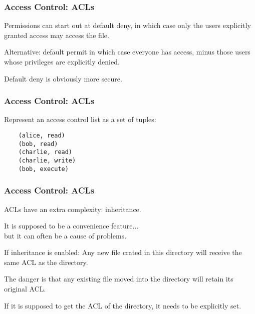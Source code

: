 \begin{frame}
\frametitle{Access Control: ACLs}


Permissions can start out at \alert{default deny}, in which case only the users explicitly granted access may access the file.

Alternative: \alert{default permit} in which case everyone has access, minus those users whose privileges are explicitly denied. 

Default deny is obviously more secure.


\end{frame}

\begin{frame}[fragile]
\frametitle{Access Control: ACLs}


Represent an access control list as a set of tuples:
\begin{verbatim}
	(alice, read)
	(bob, read)
	(charlie, read)
	(charlie, write)
	(bob, execute)
\end{verbatim}


\end{frame}

\begin{frame}
\frametitle{Access Control: ACLs}


ACLs have an extra complexity: inheritance.

It is supposed to be a convenience feature...\\
\quad but it can often be a cause of problems.

If inheritance is enabled: 
Any new file crated in this directory will receive the same ACL as the directory.

The danger is that any existing file moved into the directory will retain its original ACL. 

If it is supposed to get the ACL of the directory, it needs to be explicitly set.


\end{frame}




